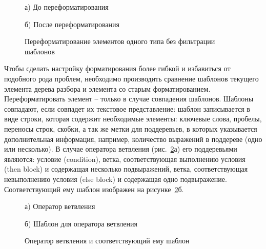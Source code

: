 %    
\begin{figure}[ht]
\noindent\begin{minipage}{.5\textwidth}
    
\caption*{а) До переформатирования}    
\end{minipage}\hfill
\begin{minipage}{.5\textwidth}
    
\caption*{б) После переформатирования}    
\end{minipage}
\caption{Переформатирование элементов одного типа без фильтрации шаблонов} 
\label{templates}
\end{figure}


Чтобы сделать настройку форматирования более гибкой и избавиться от подобного рода проблем, необходимо производить сравнение шаблонов текущего элемента дерева разбора и элемента со старым форматированием. 
Переформатировать элемент -- только в случае совпадения шаблонов.
Шаблоны совпадают, если совпадет их текстовое представление: шаблон записывается в виде строки, которая содержит необходимые элементы: ключевые слова, пробелы, переносы строк, скобки, а так же метки для поддеревьев, в которых указывается дополнительная информация, например, количество выражений в поддереве (одно или несколько).
В случае оператора ветвления (рис.~\ref{iftmpltcode}а) его поддеревьями являются: условие (condition), ветка, соответствующая выполнению условия (then block) и содержащая несколько подвыражений, ветка, соответствующая невыполнению условия (else block) и содержащая одно подвыражение. %
Соответствующий ему шаблон изображен на рисунке~\ref{iftmpltcode}б.
\begin{figure}[ht]
\noindent\begin{minipage}{.5\textwidth}
    
\caption*{а) Оператор ветвления}    
\end{minipage}\hfill
\begin{minipage}{.5\textwidth}
    
\caption*{б) Шаблон для оператора ветвления}    
\end{minipage}
\caption{Оператор ветвления и соответствующий ему шаблон}    
\label{iftmpltcode}
\end{figure}

